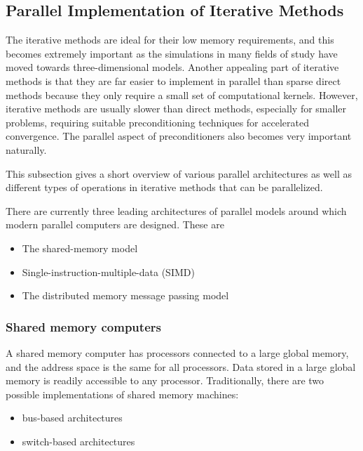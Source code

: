 \subsection{Parallel Implementation of Iterative Methods}
\label{section:parallel}
The iterative methods are ideal for their low memory requirements, and this becomes extremely important as the simulations in many fields of study have moved towards three-dimensional models. Another appealing part of iterative methods is that they are far easier to implement in parallel than sparse direct methods because they only require a small set of computational kernels. However, iterative methods are usually slower than direct methods, especially for smaller problems, requiring suitable preconditioning techniques for accelerated convergence. The parallel aspect of preconditioners also becomes very important naturally.

This subsection gives a short overview of various parallel architectures as well as different types of operations in iterative methods that can be parallelized.

There are currently three leading architectures of parallel models around which modern parallel computers are designed. These are
\begin{itemize}
    \item The shared-memory model
    \item Single-instruction-multiple-data (SIMD)
    \item The distributed memory message passing model
\end{itemize}

\subsubsection{Shared memory computers}
A shared memory computer has processors connected to a large global memory, and the address space is the same for all processors. Data stored in a large global memory is readily accessible to any processor. Traditionally, there are two possible implementations of shared memory machines: 
\begin{itemize}
    \item bus-based architectures
    \item switch-based architectures
\end{itemize}

